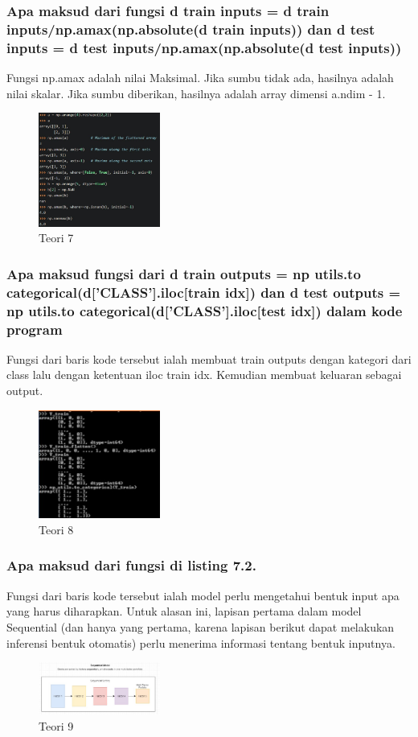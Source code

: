 \subsubsection{Apa maksud dari fungsi d train inputs = d train inputs/np.amax(np.absolute(d train inputs)) dan d test inputs = d test inputs/np.amax(np.absolute(d test inputs))}
\hfill\break
Fungsi np.amax adalah nilai Maksimal. Jika sumbu tidak ada, hasilnya adalah nilai skalar. Jika sumbu diberikan, hasilnya adalah array dimensi a.ndim - 1.
\begin{figure}[H]
\centering
	\includegraphics[width=4cm]{figures/1174053/7/7.jpg}
\caption{Teori 7}
\end{figure}

\subsubsection{Apa maksud fungsi dari d train outputs = np utils.to categorical(d[’CLASS’].iloc[train idx]) dan d test outputs = np utils.to categorical(d[’CLASS’].iloc[test idx]) dalam kode program}
\hfill\break
Fungsi dari baris kode tersebut ialah membuat train outputs dengan kategori dari class lalu dengan ketentuan iloc train idx. Kemudian membuat keluaran sebagai output.
\begin{figure}[H]
\centering
	\includegraphics[width=4cm]{figures/1174053/7/8.jpg}
\caption{Teori 8}
\end{figure}

\subsubsection{Apa maksud dari fungsi di listing 7.2.}
\hfill\break

Fungsi dari baris kode tersebut ialah model perlu mengetahui bentuk input apa yang harus diharapkan. Untuk alasan ini, lapisan pertama dalam model Sequential (dan hanya yang pertama, karena lapisan berikut dapat melakukan inferensi bentuk otomatis) perlu menerima informasi tentang bentuk inputnya.
\begin{figure}[H]
\centering
	\includegraphics[width=4cm]{figures/1174053/7/9.jpg}
\caption{Teori 9}
\end{figure}

